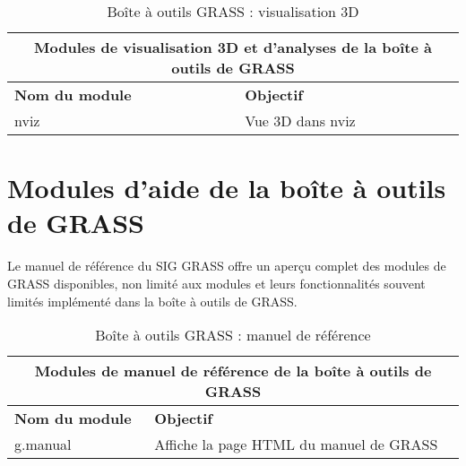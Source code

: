 \begin{table}[H]
\centering
 \begin{tabular}{|p{4cm}|p{10cm}|}
  \hline \multicolumn{2}{|c|}{\textbf{Modules de visualisation 3D et d'analyses de la boîte à outils de GRASS}} \\
  \hline \textbf{Nom du module} & \textbf{Objectif} \\
  \hline nviz & Vue 3D dans nviz\\
\hline
\end{tabular}
\caption{Boîte à outils GRASS : visualisation 3D}
\end{table}

\section{Modules d'aide de la boîte à outils de GRASS}

Le manuel de référence du SIG GRASS offre un aper\c{c}u complet des modules de GRASS disponibles, non limité aux modules et leurs fonctionnalités souvent limités implémenté dans la boîte à outils de GRASS.

\begin{table}[H]
\centering
 \begin{tabular}{|p{4cm}|p{10cm}|}
  \hline \multicolumn{2}{|c|}{\textbf{Modules de manuel de référence de la boîte à outils de GRASS}} \\
  \hline \textbf{Nom du module} & \textbf{Objectif} \\
  \hline g.manual & Affiche la page HTML du manuel de GRASS \\
\hline
\end{tabular}
\caption{Boîte à outils GRASS : manuel de référence}
\end{table}
